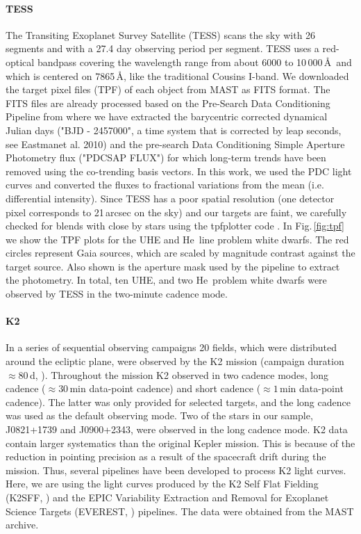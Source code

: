 \documentclass{aa}
\newcounter{Rco}
\newcommand{\Ionst}[1]{\setcounter{Rco}{#1}\Roman{Rco}}
\newcommand{\Ion}[2]{\mbox{#1\,{\scriptsize\Ionst{#2}}}}
\newcommand{\fg}[1]{\mbox{Fig.\,\ref{#1}}}
\begin{document}
\paragraph{TESS}
The Transiting Exoplanet Survey Satellite (TESS) scans the sky with
26 segments and with a 27.4 day observing period per segment.
TESS uses a red-optical bandpass covering the wavelength
range from about 6000 to 10\,000\,\AA\ and which is centered on 7865\,\AA,
like the traditional Cousins I-band.
We downloaded the target pixel files (TPF) of each object from MAST
as FITS format. The FITS files are already processed based
on the  Pre-Search Data Conditioning Pipeline \citep{Jenkins+2016}
from  where  we  have  extracted the barycentric corrected dynamical Julian days
("BJD - 2457000", a  time  system  that  is  corrected  by  leap  seconds,
see  Eastmanet  al.  2010)  and the pre-search Data Conditioning
Simple Aperture Photometry flux ("PDCSAP  FLUX") for which long-term
trends have been removed using the co-trending basis vectors.  In this work,
we  used  the  PDC  light curves and converted the fluxes to fractional
variations from the mean (i.e. differential intensity).
Since TESS has a poor spatial resolution (one detector pixel
corresponds to 21\,arcsec on the sky) and our targets are faint, we carefully
checked for blends with close by stars using the tpfplotter code
\citep{Aller+2020}.
In \fg{fig:tpf} we show the TPF plots for the UHE and \Ion{He}{2} line problem white
dwarfs. The red circles represent Gaia sources, which are scaled by
magnitude contrast against the target source. Also shown is the aperture
mask used by the pipeline to extract the photometry. In total, ten UHE, and
two \Ion{He}{2} problem white dwarfs were observed by TESS in the
two-minute cadence mode.
\paragraph{K2}
In a series of sequential observing campaigns 20 fields, which were
distributed around the ecliptic plane, were observed by the K2 mission
(campaign  duration $\approx80$\,d, \citealt{Howell+2014}).
Throughout the mission K2 observed in two cadence modes,
long cadence ($\approx30$\,min data-point cadence) and short cadence
($\approx1$\,min data-point cadence). The latter was only provided
for selected targets, and the long cadence was used as the default
observing mode. Two of the stars in our sample, J0821+1739 and
J0900+2343, were observed in the long cadence mode.
K2 data contain larger systematics than the original Kepler mission.
This is because of the reduction in pointing precision as a result
of the spacecraft drift during the mission. Thus, several pipelines
have been developed to process K2 light curves. Here, we are using
the light curves produced by the K2 Self Flat Fielding (K2SFF,
\citealt{Vanderburg+Johnson2014}) and the EPIC Variability Extraction
and Removal for Exoplanet Science Targets (EVEREST,
\citealt{Lunger+2016, Lunger+2018}) pipelines. The data were obtained
from the MAST archive.
\end{document}
